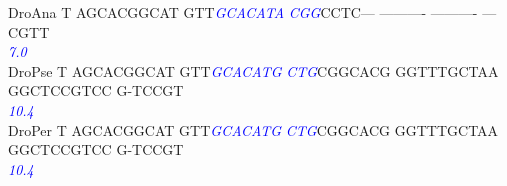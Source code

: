 \documentclass[11pt,twoside,reqno,a4paper]{article}
\begin{document}
{DroAna	T	AGCACGGCAT	GTT\textit{\textcolor{Blue}{G}}\textit{\textcolor{Blue}{C}}\textit{\textcolor{Blue}{A}}\textit{\textcolor{Blue}{C}}\textit{\textcolor{Blue}{A}}\textit{\textcolor{Blue}{T}}\textit{\textcolor{Blue}{A}}	\textit{\textcolor{Blue}{C}}\textit{\textcolor{Blue}{G}}\textit{\textcolor{Blue}{G}}CCTC---	----------	----------	---CGTT\\
\hspace*{7\charwidth}\hspace*{1\charwidth}\hspace*{1\charwidth}\hspace*{14\charwidth}\textit{\textcolor{Blue}{7.0}}\hspace*{1\charwidth}\hspace*{1\charwidth}\hspace*{1\charwidth}\hspace*{1\charwidth}\\
DroPse	T	AGCACGGCAT	GTT\textit{\textcolor{Blue}{G}}\textit{\textcolor{Blue}{C}}\textit{\textcolor{Blue}{A}}\textit{\textcolor{Blue}{C}}\textit{\textcolor{Blue}{A}}\textit{\textcolor{Blue}{T}}\textit{\textcolor{Blue}{G}}	\textit{\textcolor{Blue}{C}}\textit{\textcolor{Blue}{T}}\textit{\textcolor{Blue}{G}}CGGCACG	GGTTTGCTAA	GGCTCCGTCC	G-TCCGT\\
\hspace*{7\charwidth}\hspace*{1\charwidth}\hspace*{1\charwidth}\hspace*{14\charwidth}\textit{\textcolor{Blue}{10.4}}\hspace*{1\charwidth}\hspace*{1\charwidth}\hspace*{1\charwidth}\hspace*{1\charwidth}\\
DroPer	T	AGCACGGCAT	GTT\textit{\textcolor{Blue}{G}}\textit{\textcolor{Blue}{C}}\textit{\textcolor{Blue}{A}}\textit{\textcolor{Blue}{C}}\textit{\textcolor{Blue}{A}}\textit{\textcolor{Blue}{T}}\textit{\textcolor{Blue}{G}}	\textit{\textcolor{Blue}{C}}\textit{\textcolor{Blue}{T}}\textit{\textcolor{Blue}{G}}CGGCACG	GGTTTGCTAA	GGCTCCGTCC	G-TCCGT\\
\hspace*{7\charwidth}\hspace*{1\charwidth}\hspace*{1\charwidth}\hspace*{14\charwidth}\textit{\textcolor{Blue}{10.4}}\hspace*{1\charwidth}\hspace*{1\charwidth}\hspace*{1\charwidth}\hspace*{1\charwidth}\\
}
\end{document}
